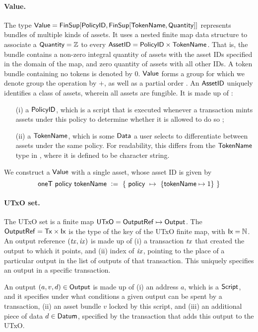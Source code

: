 \paragraph{Value. } The type $\Value = \FinSup{\Policy}{\FinSup{\TokenName}{\Quantity}}$
represents bundles of multiple kinds of assets.
It uses a nested finite map data structure to associate a $\textsf{Quantity} = \mathbb{Z}$
to every $\mathsf{AssetID} = \textsf{PolicyID} \times \mathsf{TokenName}$. That is, the bundle contains a
non-zero integral quantity of assets with the asset IDs specified
in the domain of the map, and zero quantity of assets with all other IDs.
A token bundle containing no tokens is denoted by $0$. $\mathsf{Value}$ forms a group for
which we denote group the operation by $+$, as well as a partial order \cite{utxoma}.
An $\mathsf{AssetID}$
uniquely identifies a class of assets, wherein all assets are fungible. It is made up of :

\begin{itemize}
  \item[(i)] a $\textsf{PolicyID}$, which is a script that is executed
  whenever a transaction
  mints assets under this policy to determine whether it is allowed to do so ;
  \item[(ii)] a $\mathsf{TokenName}$, which is some $\textsf{Data}$ a user selects to differentiate between
  assets under the same policy. For readability, this differs from the $\mathsf{TokenName}$ type in \cite{eutxoma},
  where it is defined to be character string.
\end{itemize}

We construct a $\mathsf{Value}$ with a single asset, whose asset ID is given by
\[ \mathsf{oneT}~\mathsf{policy}~\mathsf{tokenName}~ \mathrel{\mathop:}=~ \{~\mathsf{policy}~\mapsto~\{ \mathsf{tokenName} \mapsto 1 \}~\} \]

\paragraph{UTxO set. } The UTxO set
is a finite map $\mathsf{UTxO} = \mathsf{OutputRef} \mapsto \mathsf{Output}$.
The $\mathsf{OutputRef} = \mathsf{Tx} \times \mathsf{Ix}$ is the type of the key of the UTxO finite map, with $\mathsf{Ix} = \mathbb{N}$.
An output reference $(\mathit{tx}, \mathit{ix})$ is made up of (i) a transaction $\mathit{tx}$ that
created the output to which it points, and (ii) index of $\mathit{ix}$,
pointing to the place of a particular output in the list of outputs
of that transaction. This uniquely specifies an
output in a specific transaction.

An output $(a, v, d) \in \mathsf{Output}$ is made up of (i) an address $a$, which is a $\textsf{Script}$,
and it specifies under
what conditions a given output can be spent by a transaction, (ii) an asset bundle $v$ locked
by this script, and (iii) an additional piece of data $d \in \mathsf{Datum}$, specified
by the transaction that adds this output to the UTxO.

